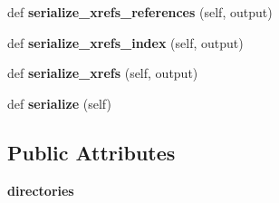 \begin{DoxyCompactItemize}
def {\bfseries serialize\+\_\+xrefs\+\_\+references} (self, output)
\item 
\mbox{\label{classapibuild_1_1doc_builder_a63038712e89273e08880a67304eeae7e}} 
def {\bfseries serialize\+\_\+xrefs\+\_\+index} (self, output)
\item 
\mbox{\label{classapibuild_1_1doc_builder_a2d37f854c18483465261677f22df3605}} 
def {\bfseries serialize\+\_\+xrefs} (self, output)
\item 
\mbox{\label{classapibuild_1_1doc_builder_ae2bd45f2dfac8dac15a6d80a89668639}} 
def {\bfseries serialize} (self)
\end{DoxyCompactItemize}
\subsection*{Public Attributes}
\begin{DoxyCompactItemize}
\item 
\mbox{\label{classapibuild_1_1doc_builder_a3ca300f5e57f1b370d2c2405ada8d38d}} 
{\bfseries directories}
\end{DoxyCompactItemize}
